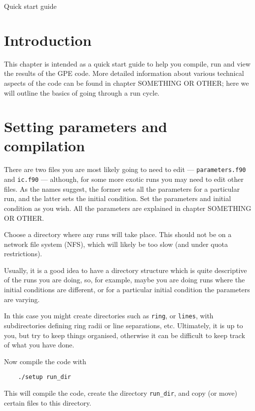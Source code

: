 
\begin{chapter}{\label{cha:quickstart} Quick start guide}
  \section{Introduction}
  This chapter is intended as a quick start guide to help you compile, run and
  view the results of the GPE code.  More detailed information about various
  technical aspects of the code can be found in chapter SOMETHING OR OTHER;
  here we will outline the basics of going through a run cycle.

  \section{Setting parameters and compilation}
  There are two files you are most likely going to need to edit ---
  \verb"parameters.f90" and \verb"ic.f90" --- although, for some more exotic
  runs you may need to edit other files.  As the names suggest, the former sets
  all the parameters for a particular run, and the latter sets the initial
  condition.  Set the parameters and initial condition as you wish.  All the
  parameters are explained in chapter SOMETHING OR OTHER.

  Choose a directory where any runs will take place.  This should not be on a
  network file system (NFS), which will likely be too slow (and under quota
  restrictions).

  Usually, it is a good idea to have a directory structure which is quite
  descriptive of the runs you are doing, so, for example, maybe you are doing
  runs where the initial conditions are different, or for a particular initial
  condition the parameters are varying.

  In this case you might create directories such as \verb"ring", or
  \verb"lines", with subdirectories defining ring radii or line separations,
  etc.  Ultimately, it is up to you, but try to keep things organised,
  otherwise it can be difficult to keep track of what you have done.

  Now compile the code with
  \begin{Verbatim}
    ./setup run_dir
  \end{Verbatim}
  This will compile the code, create the directory \verb"run_dir", and copy (or
  move) certain files to this directory.


\end{chapter}

